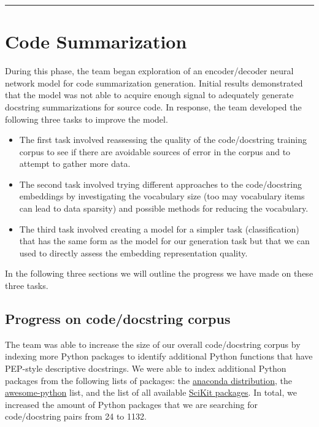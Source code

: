 \documentclass[article, 12pt, oneside]{memoir}
\begin{document}
\begin{center}\rule{0.5\linewidth}{\linethickness}\end{center}

\hypertarget{code-summarization}{%
\section{Code Summarization}\label{code-summarization}}

During this phase, the team began exploration of an encoder/decoder
neural network model for code summarization generation. Initial results
demonstrated that the model was not able to acquire enough signal to
adequately generate docstring summarizations for source code. In
response, the team developed the following three tasks to improve the
model.

\begin{itemize}
\item
  The first task involved reassessing the quality of the code/docstring
  training corpus to see if there are avoidable sources of error in the
  corpus and to attempt to gather more data.
\item
  The second task involved trying different approaches to the
  code/docstring embeddings by investigating the vocabulary size (too
  may vocabulary items can lead to data sparsity) and possible methods
  for reducing the vocabulary.
\item
  The third task involved creating a model for a simpler task
  (classification) that has the same form as the model for our
  generation task but that we can used to directly assess the embedding
  representation quality.
\end{itemize}

In the following three sections we will outline the progress we have
made on these three tasks.

\hypertarget{progress-on-codedocstring-corpus}{%
\subsection{Progress on code/docstring
corpus}\label{progress-on-codedocstring-corpus}}

The team was able to increase the size of our overall code/docstring
corpus by indexing more Python packages to identify additional Python
functions that have PEP-style descriptive docstrings. We were able to
index additional Python packages from the following lists of packages:
the
\href{https://docs.anaconda.com/anaconda/packages/py3.6_osx-64/}{anaconda
distribution}, the
\href{https://github.com/vinta/awesome-python}{awesome-python} list, and
the list of all available
\href{http://scikits.appspot.com/scikits}{SciKit packages}. In total, we
increased the amount of Python packages that we are searching for
code/docstring pairs from 24 to 1132.
\end{document}
